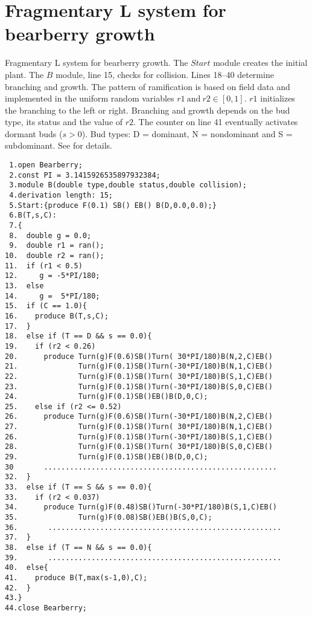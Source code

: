 \section{Fragmentary  L system   for  bearberry  growth}\label{sec:L2}

Fragmentary L system for  bearberry growth. The $Start$ module creates
the initial  plant.  The  $B$ module, line  15, checks  for collision.
Lines  18--40   determine  branching  and  growth.    The  pattern  of
ramification is  based on  field data and  implemented in  the uniform
random variables $r1~\mathrm{and}~r2 \in [0,1]$.  $r1$ initializes the
branching to the  left or right.  Branching and  growth depends on the
bud type,  its status and the value  of $r2$.  The counter  on line 41
eventually activates dormant buds ($s > 0$).  Bud types: D = dominant,
N  = nondominant  and  S =  subdominant.   See \citet{salemaa:02}  for
details.

\begin{verbatim}
 1.open Bearberry;
 2.const PI = 3.1415926535897932384;
 3.module B(double type,double status,double collision); 
 4.derivation length: 15;
 5.Start:{produce F(0.1) SB() EB() B(D,0.0,0.0);}
 6.B(T,s,C):
 7.{
 8.  double g = 0.0;
 9.  double r1 = ran();
10.  double r2 = ran();
11.  if (r1 < 0.5) 
12.     g = -5*PI/180;
13.  else 
14.     g =  5*PI/180;
15.  if (C == 1.0){
16.    produce B(T,s,C);
17.  }
18.  else if (T == D && s == 0.0){
19.    if (r2 < 0.26)
20.      produce Turn(g)F(0.6)SB()Turn( 30*PI/180)B(N,2,C)EB() 
21.              Turn(g)F(0.1)SB()Turn(-30*PI/180)B(N,1,C)EB()
22.              Turn(g)F(0.1)SB()Turn( 30*PI/180)B(S,1,C)EB()
23.              Turn(g)F(0.1)SB()Turn(-30*PI/180)B(S,0,C)EB()
24.              Turn(g)F(0.1)SB()EB()B(D,0,C);
25.    else if (r2 <= 0.52)
26.      produce Turn(g)F(0.6)SB()Turn(-30*PI/180)B(N,2,C)EB() 
27.              Turn(g)F(0.1)SB()Turn( 30*PI/180)B(N,1,C)EB()
26.              Turn(g)F(0.1)SB()Turn(-30*PI/180)B(S,1,C)EB()
28.              Turn(g)F(0.1)SB()Turn( 30*PI/180)B(S,0,C)EB()
29.              Turn(g)F(0.1)SB()EB()B(D,0,C);
30       ......................................................
32.  } 
33.  else if (T == S && s == 0.0){
33.    if (r2 < 0.037)
34.      produce Turn(g)F(0.48)SB()Turn(-30*PI/180)B(S,1,C)EB()
35.              Turn(g)F(0.08)SB()EB()B(S,0,C);
36.       ......................................................
37.  }
38.  else if (T == N && s == 0.0){
39.       ......................................................
40.  else{
41.    produce B(T,max(s-1,0),C);
42.  }
43.}
44.close Bearberry;
\end{verbatim}

